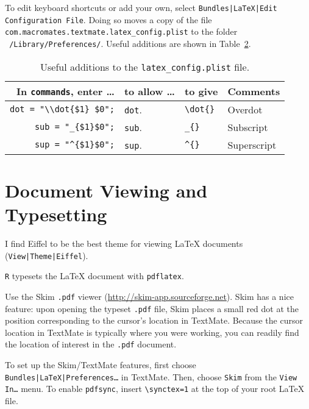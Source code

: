 \documentclass[10pt]{article}
\begin{document}
\begin{table}
\begin{tabular}{r|l|l}
\end{tabular}
\label{tab:keyboard_shortcuts}
\end{table}

To edit keyboard shortcuts or add your own, select
\texttt{Bundles|LaTeX|Edit Configuration File}. 
Doing so moves a copy of the file 
\verb!com.macromates.textmate.latex_config.plist!
to the folder
\texttt{~/Library/Preferences/}.
Useful additions are shown in Table~\ref{tab:additions_to_plist}.

\begin{table}
\centering
\caption{Useful additions to the \texttt{latex\_config.plist} file.}
\begin{tabular}{r|l|l|l}
	In \texttt{commands}, enter \dots & to allow \dots      & to give              & Comments \\
	\hline
	\verb!dot = "\\dot{$1} $0";!   & \texttt{dot}\cmdkey\shiftkey. & \verb!\dot{}! & Overdot \\
	\verb!sub = "_{$1}$0";!        & \texttt{sub}\cmdkey\shiftkey. & \verb!_{}!    & Subscript \\
	\verb!sup = "^{$1}$0";!        & \texttt{sup}\cmdkey\shiftkey. & \verb!^{}!    & Superscript \\
\end{tabular}
\label{tab:additions_to_plist}
\end{table}



\section{Document Viewing and Typesetting} %
\label{sec:document_viewing_and_typesetting}
I find Eiffel to be the best theme for viewing \LaTeX{} documents
(\texttt{View|Theme|Eiffel}). 

\cmdkey\texttt{R} typesets the \LaTeX{} document with \texttt{pdflatex}. 

Use the Skim \texttt{.pdf} viewer (\url{http://skim-app.sourceforge.net}).
Skim has a nice feature: upon opening the typeset \texttt{.pdf} file,
Skim places a small red dot at the position corresponding to the cursor's 
location in TextMate. 
Because the cursor location in TextMate is typically where you were working,
you can readily find the location of interest in the \texttt{.pdf} document.

To set up the Skim/TextMate features, 
first choose \texttt{Bundles|LaTeX|Preferences\dots} in TextMate.
Then, choose \texttt{Skim} from the \texttt{View In\dots} menu.
To enable \texttt{pdfsync}, insert \verb!\synctex=1! 
at the top of your root \LaTeX{} file.
\end{document}
